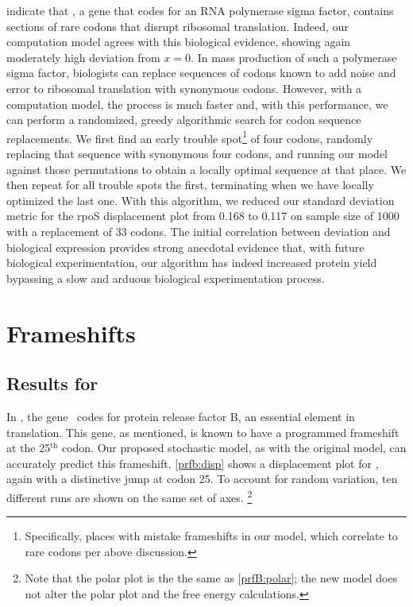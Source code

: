 \documentclass[12pt, draft]{article}
\numberwithin{equation}{section}
\begin{document}
\citet{rpos:process} indicate that \rpoS, a gene that codes for an RNA
polymerase sigma factor, contains sections of rare codons that disrupt
ribosomal translation. Indeed, our computation model agrees with this
biological evidence, showing again moderately high deviation from $x =
0$. In mass production of such a polymerase sigma factor, biologists
can replace sequences of codons known to add noise and error to
ribosomal translation with synonymous codons. 
However, with a computation model, the process is much
faster and, with this performance, we can perform a randomized, greedy
algorithmic search for codon sequence replacements. We first find an
early trouble spot\footnote{Specifically, places with
  mistake frameshifts in our model, which correlate to rare codons per
  above discussion.} of four codons, randomly replacing that sequence
with synonymous four codons, and running our model against those
permutations to obtain a locally optimal sequence at that place. We
then repeat for all trouble spots the first, terminating when we have locally
optimized the last one. With this algorithm, we reduced our standard
deviation metric for the rpoS displacement plot from 0.168 to 0.117
on sample size of 1000 with a replacement of 33 codons. The
initial correlation between deviation and biological expression
provides strong anecdotal evidence that, with future biological
experimentation, our algorithm has indeed increased protein yield
bypassing a slow and arduous biological experimentation process.

\section{Frameshifts}

\subsection{Results for \prfB}

In \ecoli, the gene \prfB\ codes for protein release factor B, an essential element in translation.
This gene, as mentioned, is known to have a programmed frameshift at
the 25$^{\textrm{th}}$ codon.
Our proposed stochastic model, as with the original model, can accurately predict this frameshift.
\autoref{prfb:disp} shows a displacement plot for \prfB, again with a distinctive jump at codon 25.
To account for random variation, ten different runs are shown on the same set of axes.
\footnote{Note that the polar plot is the the same as \autoref{prfB:polar}; 
the new model does not alter the polar plot and the free energy calculations.}
\end{document}

